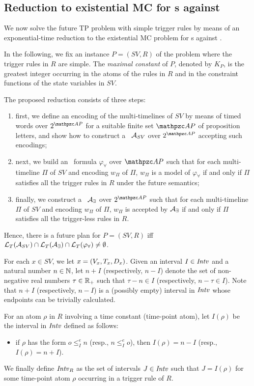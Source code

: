 \subsection{Reduction to existential MC for \TA s against \MTL}\label{sec:Reduction}
We now solve the future TP problem with simple trigger rules by means of an exponential-time reduction to the existential MC problem for \TA s against \MTL. 

In the following, we fix an instance $P=(SV,R)$ of the problem where the trigger rules in $R$ are simple. The \emph{maximal constant} of $P$, denoted by $K_P$, is the greatest integer occurring in the atoms of the rules in $R$ and in the constraint  functions of the state variables in $SV$.

The proposed reduction consists of three steps:
\begin{enumerate}
  \item first, we define an encoding of the multi-timelines of $SV$ by means of timed words over $2^{\Prop}$ for a suitable finite set $\Prop$ of proposition letters,
  and show how to construct a \TA\ $\mathcal{A}_{SV}$ over $2^{\Prop}$ accepting such encodings;
  \item next, we build an \MTL\ formula $\varphi_{\forall}$ over $\Prop$ such that for each multi-timeline $\Pi$ of $SV$ and encoding $w_\Pi$ of $\Pi$, $w_\Pi$ is a model of $\varphi_\forall$
  if and only if $\Pi$ satisfies all the trigger rules in $R$ under the future semantics;
  \item finally, we construct a \TA\ $\mathcal{A}_{\exists}$ over $2^{\Prop}$ such that for each multi-timeline $\Pi$ of $SV$ and encoding $w_\Pi$ of $\Pi$, $w_\Pi$ is accepted by $\mathcal{A}_{\exists}$
  if and only if $\Pi$ satisfies all the trigger-less rules in $R$.
\end{enumerate}
Hence, there is a future plan for $P=(SV,R)$  iff  ${\mathcal{L}_T}(\mathcal{A}_{SV})\cap {\mathcal{L}_T}(\mathcal{A}_\exists )\cap {\mathcal{L}_T}(\varphi_\forall)\neq \emptyset$. %


For each $x\in SV$, we let $x=(V_x,T_x,D_x)$.
Given an interval $I\in{\mathit{Intv}}$ and a natural number $n\in \mathbb{N}$, let $n+I$ (respectively, $n-I$) denote the set of non-negative real numbers
$\tau\in{\mathbb{R}_+}$ such that $\tau-n\in I$ (respectively, $n-\tau \in I$). Note that $n+I$ (respectively, $n-I$) is a (possibly empty) interval in ${\mathit{Intv}}$ whose endpoints can be trivially calculated.

For an atom $\rho$ in $R$ involving a time constant (time-point atom), let $I(\rho)$ be the interval in ${\mathit{Intv}}$ defined as follows:
\begin{itemize}
  \item if $\rho$ has the form  $o\leq^{e}_{I} n$ (resp., $n\leq^{e}_{I} o$), then $I(\rho)= n-I$ (resp., $I(\rho)= n+I$).
\end{itemize}
We finally define ${\mathit{Intv}}_R$ as the set of intervals $J\in{\mathit{Intv}}$ such that $J=I(\rho)$ for some time-point atom $\rho$ occurring in a trigger rule of  $R$.


